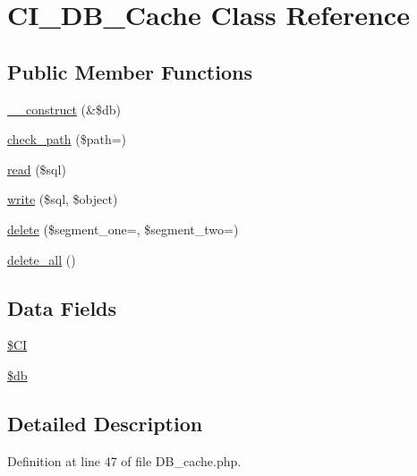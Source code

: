 \hypertarget{class_c_i___d_b___cache}{}\section{C\+I\+\_\+\+D\+B\+\_\+\+Cache Class Reference}
\label{class_c_i___d_b___cache}
\subsection*{Public Member Functions}
\begin{DoxyCompactItemize}
\item 
\mbox{\hyperlink{class_c_i___d_b___cache_aaf2ef772755ec6f361d44e16cc9ffd69}{\+\_\+\+\_\+construct}} (\&\$db)
\item 
\mbox{\hyperlink{class_c_i___d_b___cache_adb73b6f91025d00c565d228c4f611f41}{check\+\_\+path}} (\$path=\textquotesingle{}\textquotesingle{})
\item 
\mbox{\hyperlink{class_c_i___d_b___cache_a6e421e93555105d187d7e6ba4c84521b}{read}} (\$sql)
\item 
\mbox{\hyperlink{class_c_i___d_b___cache_a483ea50183465928c931aa17b4f4b5b8}{write}} (\$sql, \$object)
\item 
\mbox{\hyperlink{class_c_i___d_b___cache_ab97f36d9c24db4b2e91c9e02342cc994}{delete}} (\$segment\+\_\+one=\textquotesingle{}\textquotesingle{}, \$segment\+\_\+two=\textquotesingle{}\textquotesingle{})
\item 
\mbox{\hyperlink{class_c_i___d_b___cache_ac83c8ea1573fe325dfd87a282627fe6d}{delete\+\_\+all}} ()
\end{DoxyCompactItemize}
\subsection*{Data Fields}
\begin{DoxyCompactItemize}
\item 
\mbox{\hyperlink{class_c_i___d_b___cache_ae0314d046ddf7fcfaec03222977427d3}{\$\+CI}}
\item 
\mbox{\hyperlink{class_c_i___d_b___cache_a1fa3127fc82f96b1436d871ef02be319}{\$db}}
\end{DoxyCompactItemize}


\subsection{Detailed Description}


Definition at line 47 of file D\+B\+\_\+cache.\+php.



